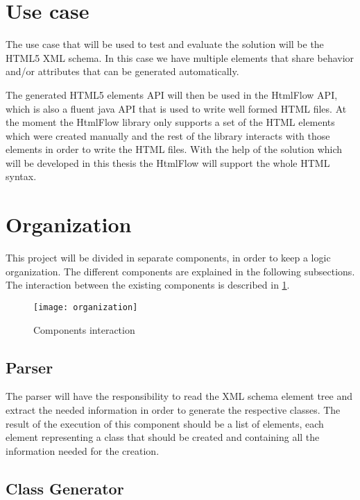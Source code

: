 \section{Use case}

The use case that will be used to test and evaluate the solution will be the HTML5 XML schema. In this case we have multiple elements that share behavior and/or attributes that can be generated automatically.

\noindent
The generated HTML5 elements API will then be used in the HtmlFlow API, which is also a fluent java API that is used to write well formed HTML files. At the moment the HtmlFlow library only supports a set of the HTML elements which were created manually and the rest of the library interacts with those elements in order to write the HTML files. With the help of the solution which will be developed in this thesis the HtmlFlow will support the whole HTML syntax.

\section{Organization}

This project will be divided in separate components, in order to keep a logic organization. The different components are explained in the following subsections. The interaction between the existing components is described in \ref{ComponentInteraction}.

\begin{figure}[ht]
	\centering
	\texttt{[image: organization]}
	\caption{Components interaction}
	\label{ComponentInteraction}
\end{figure}

\subsection{Parser}

The parser will have the responsibility to read the XML schema element tree and extract the needed information in order to generate the respective classes. The result of the execution of this component should be a list of elements, each element representing a class that should be created and containing all the information needed for the creation.

\subsection{Class Generator}

